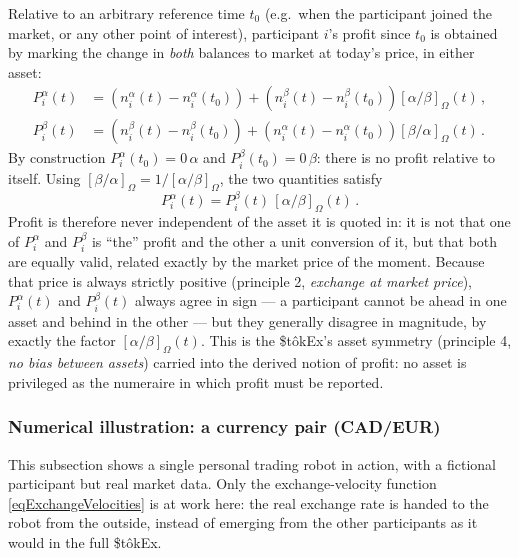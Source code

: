 \documentclass[letterpaper]{article}
\newcommand{\priceAB}{\left[\alpha / \beta\right]}
\newcommand{\priceBA}{\left[\beta / \alpha\right]}
\newcommand{\StokEx}{\$t\^{o}kEx}
\begin{document}
Relative to an arbitrary reference time $t_0$ (e.g.\ when the participant joined the market, or any other point of interest), participant $i$'s profit since $t_0$ is obtained by marking the change in \emph{both} balances to market at today's price, in either asset:
\begin{align}
    P_i^\alpha(t) &= \left(n_i^\alpha(t) - n_i^\alpha(t_0)\right) + \left(n_i^\beta(t) - n_i^\beta(t_0)\right)\priceAB_\Omega\!(t) \,, \label{eqParticipantProfitAlpha}\\
    P_i^\beta(t) &= \left(n_i^\beta(t) - n_i^\beta(t_0)\right) + \left(n_i^\alpha(t) - n_i^\alpha(t_0)\right)\priceBA_\Omega\!(t) \,. \label{eqParticipantProfitBeta}
\end{align}
By construction $P_i^\alpha(t_0) = 0\,\alpha$ and $P_i^\beta(t_0) = 0\,\beta$: there is no profit relative to itself. Using $\priceBA_\Omega = 1/\priceAB_\Omega$, the two quantities satisfy
\begin{equation}
    P_i^\alpha(t) = P_i^\beta(t)\, \priceAB_\Omega(t) \,. \label{eqProfitIdentity}
\end{equation}
Profit is therefore never independent of the asset it is quoted in: it is not that one of $P_i^\alpha$ and $P_i^\beta$ is ``the'' profit and the other a unit conversion of it, but that both are equally valid, related exactly by the market price of the moment. Because that price is always strictly positive (principle 2, \emph{exchange at market price}), $P_i^\alpha(t)$ and $P_i^\beta(t)$ always agree in sign --- a participant cannot be ahead in one asset and behind in the other --- but they generally disagree in magnitude, by exactly the factor $\priceAB_\Omega(t)$. This is the \StokEx{}'s asset symmetry (principle 4, \emph{no bias between assets}) carried into the derived notion of profit: no asset is privileged as the numeraire in which profit must be reported.


\subsubsection{Numerical illustration: a currency pair (CAD/EUR)}

This subsection shows a single personal trading robot in action, with a fictional participant but real market data.
Only the exchange-velocity function \eqref{eqExchangeVelocities} is at work here: the real exchange rate is handed to the robot from the outside, instead of emerging from the other participants as it would in the full \StokEx{}.
\end{document}
